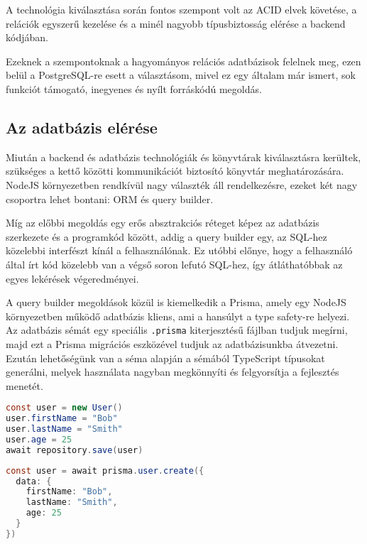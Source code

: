 A technológia kiválasztása során fontos szempont volt az ACID elvek követése, a relációk egyszerű kezelése és a minél nagyobb típusbiztosság elérése a backend kódjában.

Ezeknek a szempontoknak a hagyományos relációs adatbázisok felelnek meg, ezen belül a PostgreSQL-re esett a választásom, mivel ez egy általam már ismert, sok funkciót támogató, inegyenes és nyílt forráskódú megoldás.

\subsection{Az adatbázis elérése}
Miután a backend és adatbázis technológiák és könyvtárak kiválasztásra kerültek, szükséges a kettő közötti kommunikációt biztosító könyvtár meghatározására.
NodeJS környezetben rendkívül nagy választék áll rendelkezésre, ezeket két nagy csoportra lehet bontani: ORM és query builder.

Míg az előbbi megoldás egy erős absztrakciós réteget képez az adatbázis szerkezete és a programkód között, addig a query builder egy, az SQL-hez közelebbi interfészt kínál a felhasználónak.
Ez utóbbi előnye, hogy a felhasználó által írt kód közelebb van a végső soron lefutó SQL-hez, így átláthatóbbak az egyes lekérések végeredményei.

A query builder megoldások közül is kiemelkedik a Prisma, amely egy NodeJS környezetben működő adatbázis kliens, ami a hansúlyt a type safety-re helyezi.
Az adatbázis sémát egy speciális \lstinline|.prisma| kiterjesztésű fájlban tudjuk megírni, majd ezt a Prisma migrációs eszközével tudjuk az adatbázisunkba átvezetni.
Ezután lehetőségünk van a séma alapján a sémából TypeScript típusokat generálni, melyek használata nagyban megkönnyíti és felgyorsítja a fejlesztés menetét.

\begin{lstlisting}[language=Java, caption=Adatbázis beillesztés TypeORM környezetben]
const user = new User()
user.firstName = "Bob"
user.lastName = "Smith"
user.age = 25
await repository.save(user)
\end{lstlisting}

\begin{lstlisting}[language=Java, caption=Adatbázis beillesztés Prisma segítségével]
const user = await prisma.user.create({
  data: {
    firstName: "Bob",
    lastName: "Smith",
    age: 25
  }
})
\end{lstlisting}

